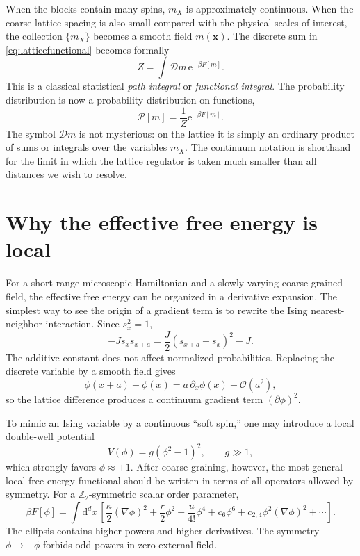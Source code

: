 \documentclass[11pt]{article}
\newcommand{\dd}{\mathrm{d}}
\newcommand{\e}{\mathrm{e}}
\newcommand{\cD}{\mathcal{D}}
\newcommand{\cO}{\mathcal{O}}
\begin{document}
When the blocks contain many spins, $m_X$ is approximately continuous.  When the coarse lattice spacing is also small compared with the physical scales of interest, the collection $\{m_X\}$ becomes a smooth field $m(\bm x)$.  The discrete sum in \eqref{eq:latticefunctional} becomes formally
\begin{equation}
  \boxed{
  Z=\int \cD m\,\e^{-\beta F[m]}.
  }
  \label{eq:functionalintegral}
\end{equation}
This is a classical statistical \emph{path integral} or \emph{functional integral}.  The probability distribution is now a probability distribution on functions,
\begin{equation}
  \mathcal P[m]=\frac{1}{Z}\e^{-\beta F[m]}.
\end{equation}
The symbol $\cD m$ is not mysterious: on the lattice it is simply an ordinary product of sums or integrals over the variables $m_X$.  The continuum notation is shorthand for the limit in which the lattice regulator is taken much smaller than all distances we wish to resolve.

\section{Why the effective free energy is local}

For a short-range microscopic Hamiltonian and a slowly varying coarse-grained field, the effective free energy can be organized in a derivative expansion.  The simplest way to see the origin of a gradient term is to rewrite the Ising nearest-neighbor interaction.  Since $s_x^2=1$,
\begin{equation}
  -J s_x s_{x+a}
  =\frac{J}{2}(s_{x+a}-s_x)^2-J.
  \label{eq:isinggradient}
\end{equation}
The additive constant does not affect normalized probabilities.  Replacing the discrete variable by a smooth field gives
\begin{equation}
  \phi(x+a)-\phi(x)=a\,\partial_x\phi(x)+\cO(a^2),
\end{equation}
so the lattice difference produces a continuum gradient term $(\partial\phi)^2$.

To mimic an Ising variable by a continuous ``soft spin,'' one may introduce a local double-well potential
\begin{equation}
  V(\phi)=g(\phi^2-1)^2,
  \qquad g\gg1,
\end{equation}
which strongly favors $\phi\approx\pm1$.  After coarse-graining, however, the most general local free-energy functional should be written in terms of all operators allowed by symmetry.  For a $\mathbb Z_2$-symmetric scalar order parameter,
\begin{equation}
  \beta F[\phi]
  =\int \dd^d x\,
  \left[
  \frac{\kappa}{2}(\nabla\phi)^2
  +\frac{r}{2}\phi^2
  +\frac{u}{4!}\phi^4
  +c_6\phi^6
  +c_{2,4}\phi^2(\nabla\phi)^2
  +\cdots
  \right].
  \label{eq:LG}
\end{equation}
The ellipsis contains higher powers and higher derivatives.  The symmetry $\phi\to-\phi$ forbids odd powers in zero external field.
\end{document}

